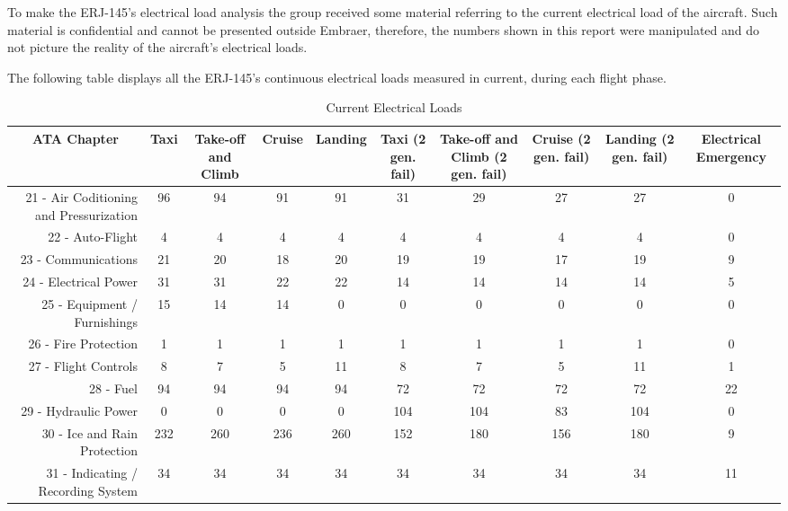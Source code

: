 ﻿%
To make the ERJ-145's electrical load analysis the group received some material referring to the current electrical load of the aircraft. Such material is confidential and cannot be presented outside Embraer, therefore, the numbers shown in this report were manipulated and do not picture the reality of the aircraft's electrical loads.

The following table displays all the ERJ-145's continuous electrical loads measured in current, during each flight phase.

\begin{table}[htbp]
  \centering
  \caption{Current Electrical Loads}
    \begin{tabular}{rccccccccc}
    \toprule
    \multicolumn{1}{c}{ATA Chapter} & Taxi  & Take-off and Climb & Cruise & Landing & Taxi (2 gen. fail) & Take-off and Climb (2 gen. fail) & Cruise  (2 gen. fail) & Landing  (2 gen. fail) & Electrical Emergency \\
    \midrule
    21 - Air Coditioning and Pressurization & 96    & 94    & 91    & 91    & 31    & 29    & 27    & 27    & 0 \\
    22 - Auto-Flight & 4     & 4     & 4     & 4     & 4     & 4     & 4     & 4     & 0 \\
    23 - Communications & 21    & 20    & 18    & 20    & 19    & 19    & 17    & 19    & 9 \\
    24 - Electrical Power & 31    & 31    & 22    & 22    & 14    & 14    & 14    & 14    & 5 \\
    25 - Equipment / Furnishings & 15    & 14    & 14    & 0     & 0     & 0     & 0     & 0     & 0 \\
    26 - Fire Protection & 1     & 1     & 1     & 1     & 1     & 1     & 1     & 1     & 0 \\
    27 - Flight Controls & 8     & 7     & 5     & 11    & 8     & 7     & 5     & 11    & 1 \\
    28 - Fuel & 94    & 94    & 94    & 94    & 72    & 72    & 72    & 72    & 22 \\
    29 - Hydraulic Power & 0     & 0     & 0     & 0     & 104   & 104   & 83    & 104   & 0 \\
    30 - Ice and Rain Protection & 232   & 260   & 236   & 260   & 152   & 180   & 156   & 180   & 9 \\
    31 - Indicating / Recording System & 34    & 34    & 34    & 34    & 34    & 34    & 34    & 34    & 11 \\

\end{tabular}
\end{table}
